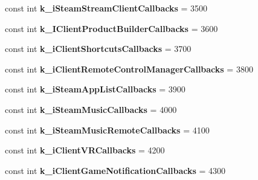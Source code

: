 \begin{DoxyCompactItemize}
const int {\bfseries k\+\_\+i\+Steam\+Stream\+Client\+Callbacks} = 3500
\item 
\mbox{\label{class_valve_1_1_steamworks_1_1_steam_a_p_i_a632120dfc85ab814b893e2fe9ee84226}} 
const int {\bfseries k\+\_\+\+I\+Client\+Product\+Builder\+Callbacks} = 3600
\item 
\mbox{\label{class_valve_1_1_steamworks_1_1_steam_a_p_i_a7befe9d6e24dad00cd2da6cf56c59108}} 
const int {\bfseries k\+\_\+i\+Client\+Shortcuts\+Callbacks} = 3700
\item 
\mbox{\label{class_valve_1_1_steamworks_1_1_steam_a_p_i_a8f8514628f363452ca121f1f738cbefa}} 
const int {\bfseries k\+\_\+i\+Client\+Remote\+Control\+Manager\+Callbacks} = 3800
\item 
\mbox{\label{class_valve_1_1_steamworks_1_1_steam_a_p_i_a6f37dab031a0ede7ef736c1894472806}} 
const int {\bfseries k\+\_\+i\+Steam\+App\+List\+Callbacks} = 3900
\item 
\mbox{\label{class_valve_1_1_steamworks_1_1_steam_a_p_i_a8b48810203c70cd36b69af463fbca9cb}} 
const int {\bfseries k\+\_\+i\+Steam\+Music\+Callbacks} = 4000
\item 
\mbox{\label{class_valve_1_1_steamworks_1_1_steam_a_p_i_a5f1cab9d943ec16117ff71545298d22b}} 
const int {\bfseries k\+\_\+i\+Steam\+Music\+Remote\+Callbacks} = 4100
\item 
\mbox{\label{class_valve_1_1_steamworks_1_1_steam_a_p_i_a548f29e00964c05ad1a3d162ff0b12ec}} 
const int {\bfseries k\+\_\+i\+Client\+V\+R\+Callbacks} = 4200
\item 
\mbox{\label{class_valve_1_1_steamworks_1_1_steam_a_p_i_a1ea41c712c10152cba2d6dcbb910f73c}} 
const int {\bfseries k\+\_\+i\+Client\+Game\+Notification\+Callbacks} = 4300
\item 
\mbox{\label{class_valve_1_1_steamworks_1_1_steam_a_p_i_a85ffcd2f8e441cf23c9e6898fc0e7e68}} 

\end{DoxyCompactItemize}
